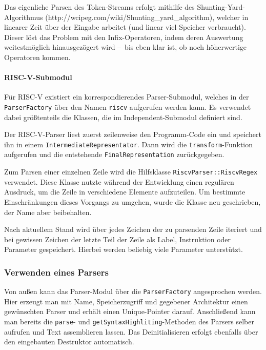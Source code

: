 Das eigenliche Parsen des Token-Streams erfolgt mithilfe des Shunting-Yard-Algorithmus (http://wcipeg.com/wiki/Shunting_yard_algorithm), welcher in linearer Zeit über der Eingabe arbeitet (und linear viel Speicher verbraucht). Dieser löst das Problem mit den Infix-Operatoren, indem deren Auswertung weitestmöglich hinausgezögert wird – bis eben klar ist, ob noch höherwertige Operatoren kommen.

\paragraph{RISC-V-Submodul}

Für RISC-V existiert ein korrespondierendes Parser-Submodul, welches in der
\texttt{ParserFactory} über den Namen \texttt{riscv} aufgerufen werden kann. Es
verwendet dabei größtenteils die Klassen, die im Independent-Submodul definiert
sind.

Der RISC-V-Parser liest zuerst zeilenweise den Programm-Code ein und speichert
ihn in einem \texttt{Intermediate\-Representator}. Dann wird die
\texttt{transform}-Funktion aufgerufen und die entstehende
\texttt{Final\-Representation} zurückgegeben.

Zum Parsen einer einzelnen Zeile wird die Hilfsklasse
\texttt{RiscvParser::\allowbreak{}RiscvRegex} verwendet. Diese Klasse nutzte
während der Entwicklung einen regulären Ausdruck, um die Zeile in
verschiedene Elemente aufzuteilen. Um bestimmte Einschränkungen dieses Vorgangs
zu umgehen, wurde die Klasse neu geschrieben, der Name aber beibehalten.

Nach aktuellem Stand wird über jedes Zeichen der zu parsenden Zeile iteriert und
bei gewissen Zeichen der letzte Teil der Zeile als Label, Instruktion oder
Parameter gespeichert. Hierbei werden beliebig viele Parameter unterstützt.

\subsubsection{Verwenden eines Parsers}

Von außen kann das Parser-Modul über die \texttt{ParserFactory} angesprochen
werden. Hier erzeugt man mit Name, Speicherzugriff und gegebener Architektur
einen gewünschten Parser und erhält einen Unique-Pointer darauf. Anschließend
kann man bereits die \texttt{parse}- und \texttt{getSyntaxHighliting}-Methoden
des Parsers selber aufrufen und Text assemblieren lassen. Das Deinitialisieren
erfolgt ebenfalls über den eingebauten Destruktor automatisch.

